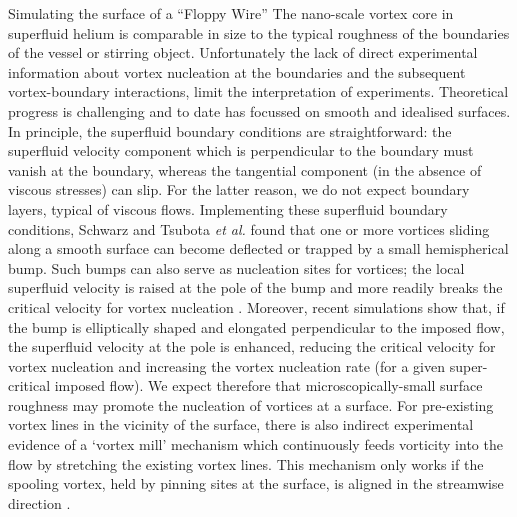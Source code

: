 \begin{chapter}{\label{cha:afm}Simulating the surface of a ``Floppy Wire''}
The nano-scale vortex core in superfluid helium is comparable in size 
to the typical roughness of the boundaries of the vessel or stirring object. 
Unfortunately the lack of direct experimental information about vortex 
nucleation at the boundaries and the subsequent vortex-boundary interactions,
limit the interpretation of experiments. Theoretical
progress is challenging and to date has focussed on smooth and idealised surfaces.  In principle, the superfluid boundary conditions
are straightforward:
the superfluid velocity
component which is perpendicular to the boundary must vanish
at the boundary, whereas the tangential component (in the absence of
viscous stresses) can slip.  For the latter reason, we do not expect boundary layers,
typical of viscous flows.   
Implementing these {superfluid} boundary conditions, 
Schwarz \cite{Schwarz-1981-pinning}
and Tsubota {\it et al.} \cite{Tsubota-1994-pinning}
found that one or more vortices sliding along a smooth surface
can become deflected or trapped by a small
hemispherical bump.  Such bumps can also serve as nucleation sites for vortices;  the local superfluid velocity is raised at the pole of the bump and more readily breaks the critical velocity for vortex nucleation \cite{winiecki}.  Moreover, recent simulations \cite{Stagg-ellipse} show that, if
the bump is elliptically shaped and elongated perpendicular to the imposed flow, the superfluid velocity at the pole
is enhanced, reducing the critical velocity for vortex nucleation and increasing the vortex nucleation rate (for a given super-critical imposed flow). 
We expect therefore that microscopically-small surface roughness may promote the nucleation of vortices at a surface.
For pre-existing vortex lines in the vicinity of the surface, there is also indirect experimental evidence of a `vortex mill' mechanism 
which continuously feeds vorticity into the flow by stretching 
{the existing vortex} lines. This mechanism only works if the spooling vortex, 
held by pinning sites at the surface, is aligned in the streamwise direction \cite{Schwarz-mill}.


\end{chapter}
